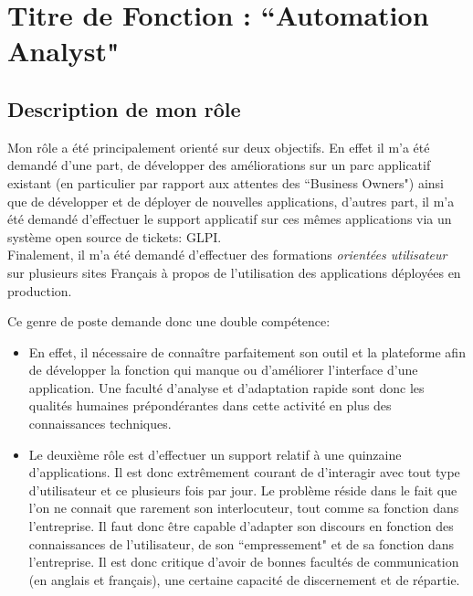 \section{Titre de Fonction : ``Automation Analyst"}

\subsection{Description de mon rôle}

Mon rôle a été principalement orienté sur deux objectifs. En effet il m'a été demandé d'une part, de développer des améliorations sur un parc applicatif existant (en particulier par rapport aux attentes des ``Business Owners") ainsi que de développer et de déployer de nouvelles applications, d'autres part, il m'a été demandé d'effectuer le support applicatif sur ces mêmes applications via un système open source de tickets: GLPI.\\
Finalement, il m'a été demandé d'effectuer des formations \emph{orientées utilisateur} sur plusieurs sites Français à propos de l'utilisation des applications déployées en production.

Ce genre de poste demande donc une double compétence:

\begin{itemize}\itemsep7pt

	\item En effet, il nécessaire de connaître parfaitement son outil et la plateforme afin de développer la fonction qui manque ou d'améliorer l'interface d'une application. Une faculté d'analyse et d'adaptation rapide sont donc les qualités humaines prépondérantes dans cette activité en plus des connaissances techniques.
	
	\item Le deuxième rôle est d'effectuer un support relatif à une quinzaine d'applications. Il est donc extrêmement courant de d'interagir avec tout type d'utilisateur et ce plusieurs fois par jour. Le problème réside dans le fait que l'on ne connait que rarement son interlocuteur, tout comme sa fonction dans l'entreprise. Il faut donc être capable d'adapter son discours en fonction des connaissances de l'utilisateur, de son ``empressement" et de sa fonction dans l'entreprise. Il est donc critique d'avoir de bonnes facultés de communication (en anglais et français), une certaine capacité de discernement et de répartie.
	
\end{itemize} 


